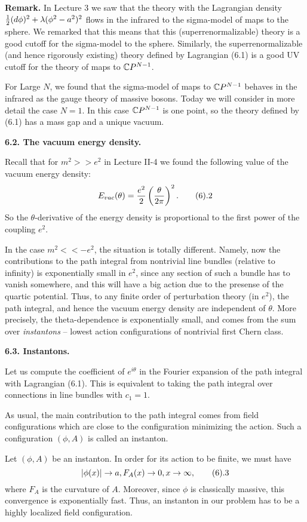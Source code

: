 {\bf Remark.} In Lecture 3 we saw that the theory 
with the Lagrangian density $\frac{1}{2}(d\phi)^2+\lambda(\phi^2-a^2)^2$ 
flows in the infrared to the sigma-model of maps to the sphere. We
remarked that this means that this (superrenormalizable) theory 
is a good cutoff for the sigma-model to the sphere. Similarly, 
the superrenormalizable (and hence rigorously existing) theory 
defined by Lagrangian (6.1) is a good UV cutoff for the theory of maps to 
$\Bbb C P^{N-1}$. 

For Large $N$, we found that the sigma-model of maps 
to $\Bbb C P^{N-1}$ behaves in the infrared as the gauge theory  
of massive bosons. Today we will consider in more detail the case $N=1$. 
In this case $\Bbb C P^{N-1}$ is one point, so the theory defined by 
(6.1) has a mass gap and a unique vacuum. 

{\bf 6.2. The vacuum energy density.} 

Recall that for $m^2>>e^2$ in Lecture II-4 we found the following value 
of the vacuum energy density:
$$
E_{vac}(\theta)=\frac{e^2}{2}\left(\frac{\theta}{2\pi}\right)^2.\tag 6.2
$$
So the $\theta$-derivative of the energy density 
is proportional to the first power of the coupling $e^2$. 

In the case $m^2<<-e^2$, the situation is totally different. Namely, now 
the contributions to the path integral from nontrivial line bundles
(relative to infinity) 
is exponentially small in $e^2$, since any section of such a bundle 
has to vanish somewhere, and this will have a big action due to the presense
of the quartic potential. Thus, to any finite order of perturbation 
theory (in $e^2$), the path integral,
and hence the vacuum energy density are independent of $\theta$. 
More precisely, the theta-dependence is exponentially small, and comes from 
the sum over {\it instantons} -- lowest action configurations of nontrivial 
first Chern class. 

{\bf 6.3. Instantons.}

Let us compute the coefficient of $e^{i\theta}$ in the Fourier expansion 
of the path integral with Lagrangian (6.1). This is equivalent to taking 
the path integral over connections in line bundles with $c_1=1$. 

As usual, the main contribution to the path integral comes from field 
configurations which are close to the configuration minimizing 
the action. Such a configuration $(\phi,A)$ is called an instanton.

Let $(\phi,A)$ be an instanton. 
In order for its action to be finite, we must have
$$
|\phi(x)|\to a, F_A(x)\to 0, x\to \infty,\tag 6.3
$$
where $F_A$ is the curvature of $A$. Moreover,   
since $\phi$ is classically massive, this convergence 
is exponentially fast. Thus, an instanton in our problem 
has to be a highly localized field configuration. 

